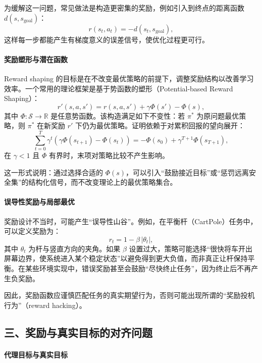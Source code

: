 为缓解这一问题，常见做法是构造更密集的奖励，例如引入到终点的距离函数 $d(s,s_{\text{goal}})$：
\[
r(s_t,a_t) = -d(s_t,s_{\text{goal}}),
\]
这样每一步都能产生有梯度意义的误差信号，使优化过程更可行。

\paragraph{奖励塑形与潜在函数}

Reward shaping 的目标是在不改变最优策略的前提下，调整奖励结构以改善学习效率。一个常用的理论框架是基于势函数的塑形（Potential-based Reward Shaping）：
\[
r'(s,a,s') = r(s,a,s') + \gamma\Phi(s') - \Phi(s),
\]
其中 $\Phi:\mathcal{S}\to\mathbb{R}$ 是任意势函数。该构造满足如下不变性：若 $\pi^\ast$ 为原问题最优策略，则 $\pi^\ast$ 在新奖励 $r'$ 下仍为最优策略。证明依赖于对累积回报的望向展开：
\[
\sum_{t=0}^{T}\gamma^t (\gamma\Phi(s_{t+1}) - \Phi(s_t))
= -\Phi(s_0) + \gamma^{T+1}\Phi(s_{T+1}),
\]
在 $\gamma<1$ 且 $\Phi$ 有界时，末项对策略比较不产生影响。

这一形式说明：通过选择合适的 $\Phi(s)$，可以引入“鼓励接近目标”或“惩罚远离安全集”的结构化信号，而不改变理论上的最优策略集合。

\paragraph{误导性奖励与局部最优}

奖励设计不当时，可能产生“误导性山谷”。例如，在平衡杆（CartPole）任务中，可以定义奖励为：
\[
r_t = 1 - \beta\,|\theta_t|,
\]
其中 $\theta_t$ 为杆与竖直方向的夹角。如果 $\beta$ 设置过大，策略可能选择“很快将车开出屏幕边界，使系统进入某个稳定状态”以避免得到更大负值，而非真正让杆保持平衡。在某些环境实现中，错误奖励甚至会鼓励“尽快终止任务”，因为终止后不再产生负奖励。

因此，奖励函数应谨慎匹配任务的真实期望行为，否则可能出现所谓的“奖励投机行为”（reward hacking）。

\subsection*{三、奖励与真实目标的对齐问题}

\paragraph{代理目标与真实目标}

